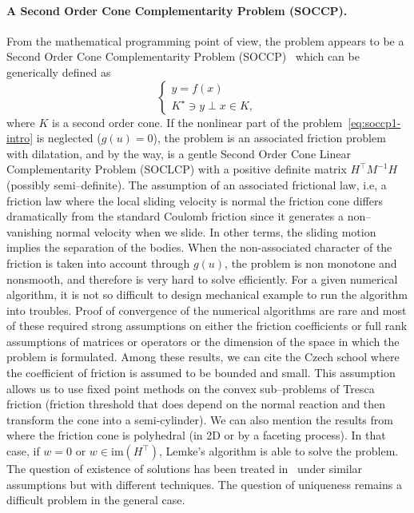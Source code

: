\paragraph{A Second Order Cone Complementarity Problem (SOCCP).}
From the mathematical programming point of view, the problem appears to be a Second Order Cone Complementarity Problem (SOCCP)~\cite{Facchinei.Pang2003} which can be generically defined as
\begin{equation}
  \begin{cases}
    y =f(x) \\
    K^\star \ni y \perp x \in K,
  \end{cases}
\end{equation}
where $K$ is a second order cone. If the nonlinear part of the problem~\eqref{eq:soccp1-intro} is neglected ($g(u)=0$), the problem is an associated friction problem with dilatation, and by the way, is a gentle Second Order Cone Linear Complementarity Problem (SOCLCP) with a positive definite matrix $H^\top M^{-1} H$ (possibly semi--definite). {The assumption of an associated frictional law, i.e, a friction law where the local sliding velocity is normal the friction cone differs dramatically from the standard Coulomb friction since it generates a non--vanishing normal velocity when we slide. In other terms, the sliding motion implies the separation of the bodies.}
When the non-associated character of the friction is taken into account through $g(u)$, the problem is non monotone and nonsmooth, and therefore is very hard to solve efficiently. For a given numerical algorithm, it is not so difficult to design mechanical example to run the algorithm into troubles.
{Proof of convergence} of the numerical algorithms are rare and most of these required strong assumptions {on either} the friction coefficients or full rank assumptions of matrices or operators or the dimension of the space in which the problem is formulated. Among these results, we can cite the Czech school where the coefficient of friction is assumed to be bounded and small. This assumption allows us to use fixed point methods on the convex sub--problems of Tresca friction {(friction threshold that does depend on the normal reaction and then transform the cone into a semi-cylinder)}. We can also mention the results from~\cite{Pang.Trinkle1996,Stewart.Trinkle1996,Anitescu.Potra97} where the friction cone is polyhedral (in 2D or by a faceting process). In that case, if $w=0$ or $w \in \mathrm{im}(H^\top)$, Lemke's algorithm is able to solve the problem. The question of existence of solutions has been treated in~\cite{Klarbring.Pang1998,Acary.ea_ZAMM2011} under similar assumptions but with different techniques. The question of uniqueness remains a difficult problem in the general case.

